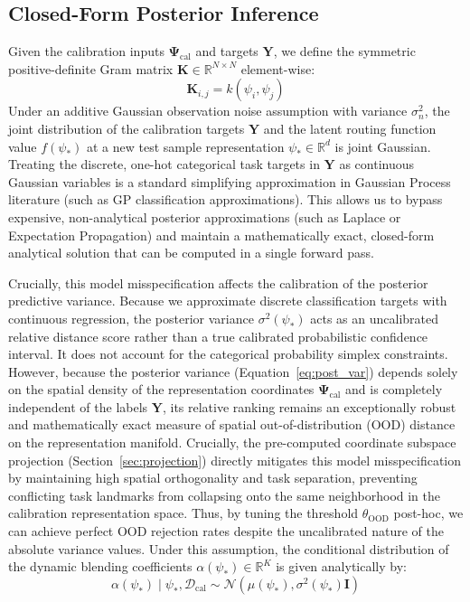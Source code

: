 \subsection{Closed-Form Posterior Inference}
Given the calibration inputs $\mathbf{\Psi}_{\text{cal}}$ and targets $\mathbf{Y}$, we define the symmetric positive-definite Gram matrix $\mathbf{K} \in \mathbb{R}^{N \times N}$ element-wise:
\begin{equation}
\mathbf{K}_{i, j} = k(\psi_i, \psi_j)
\end{equation}
Under an additive Gaussian observation noise assumption with variance $\sigma_n^2$, the joint distribution of the calibration targets $\mathbf{Y}$ and the latent routing function value $f(\psi_*)$ at a new test sample representation $\psi_* \in \mathbb{R}^d$ is joint Gaussian. Treating the discrete, one-hot categorical task targets in $\mathbf{Y}$ as continuous Gaussian variables is a standard simplifying approximation in Gaussian Process literature (such as GP classification approximations). This allows us to bypass expensive, non-analytical posterior approximations (such as Laplace or Expectation Propagation) and maintain a mathematically exact, closed-form analytical solution that can be computed in a single forward pass. 

Crucially, this model misspecification affects the calibration of the posterior predictive variance. Because we approximate discrete classification targets with continuous regression, the posterior variance $\sigma^2(\psi_*)$ acts as an uncalibrated relative distance score rather than a true calibrated probabilistic confidence interval. It does not account for the categorical probability simplex constraints. However, because the posterior variance (Equation~\ref{eq:post_var}) depends solely on the spatial density of the representation coordinates $\mathbf{\Psi}_{\text{cal}}$ and is completely independent of the labels $\mathbf{Y}$, its relative ranking remains an exceptionally robust and mathematically exact measure of spatial out-of-distribution (OOD) distance on the representation manifold. Crucially, the pre-computed coordinate subspace projection (Section~\ref{sec:projection}) directly mitigates this model misspecification by maintaining high spatial orthogonality and task separation, preventing conflicting task landmarks from collapsing onto the same neighborhood in the calibration representation space. Thus, by tuning the threshold $\theta_{\text{OOD}}$ post-hoc, we can achieve perfect OOD rejection rates despite the uncalibrated nature of the absolute variance values. Under this assumption, the conditional distribution of the dynamic blending coefficients $\alpha(\psi_*) \in \mathbb{R}^K$ is given analytically by:
\begin{equation}
\alpha(\psi_*) \mid \psi_*, \mathcal{D}_{\text{cal}} \sim \mathcal{N}\left(\mu(\psi_*), \sigma^2(\psi_*)\mathbf{I}\right)
\end{equation}

